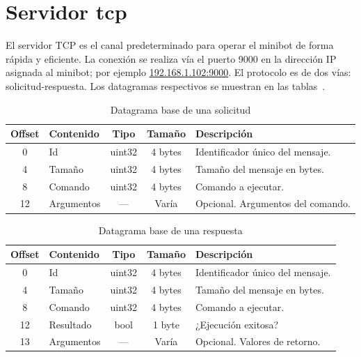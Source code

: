 \documentclass[letterpaper,10.5pt]{article}
\begin{document}
\cleardoublepage{}
\section{Servidor tcp}
El servidor TCP es el canal predeterminado para operar el minibot de forma rápida y eficiente.
La conexión se realiza vía el puerto 9000 en la dirección IP asignada al minibot; por ejemplo \url{192.168.1.102:9000}.
El protocolo es de dos vías: solicitud-respuesta. Los datagramas respectivos se muestran en las tablas~.

\begin{table}[H]
	\centering
	\caption{Datagrama base de una solicitud}%
	\label{tbl:request}
	\begin{tabularx}{0.8\linewidth}{c l c c X}
		\toprule
		Offset & Contenido & Tipo   & Tamaño & Descripción \\
		\midrule
		0      & Id        & uint32 & 4 bytes & Identificador único del mensaje.  \\
		4      & Tamaño    & uint32 & 4 bytes & Tamaño del mensaje en bytes.      \\
		8      & Comando   & uint32 & 4 bytes & Comando a ejecutar.               \\
		12     & Argumentos& ---    & Varía   & Opcional. Argumentos del comando. \\
		\bottomrule
	\end{tabularx}
\end{table}

\begin{table}[H]
	\centering
	\caption{Datagrama base de una respuesta}%
	\label{tbl:reply}
	\begin{tabularx}{0.8\linewidth}{c l c c X}
		\toprule
		Offset & Contenido & Tipo   & Tamaño & Descripción \\
		\midrule
		0      & Id        & uint32 & 4 bytes & Identificador único del mensaje.  \\
		4      & Tamaño    & uint32 & 4 bytes & Tamaño del mensaje en bytes.      \\
		8      & Comando   & uint32 & 4 bytes & Comando a ejecutar.               \\
		12     & Resultado &  bool  & 1 byte  & ¿Ejecución exitosa?               \\
		13     & Argumentos& ---    & Varía   & Opcional. Valores de retorno.     \\
		\bottomrule
	\end{tabularx}
\end{table}
\end{document}
